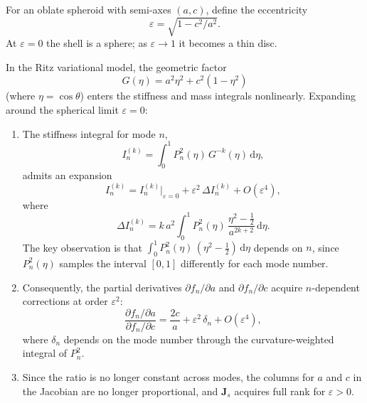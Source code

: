 For an oblate spheroid with semi-axes $(a,c)$, define the eccentricity
\begin{equation}\label{eq:eccentricity}
  \varepsilon = \sqrt{1 - c^2/a^2}.
\end{equation}
At $\varepsilon = 0$ the shell is a sphere; as $\varepsilon \to 1$ it becomes a
thin disc.

\begin{proposition}\label{prop:eccentricity}
In the Ritz variational model, the geometric factor
\begin{equation}\label{eq:Geta}
  G(\eta) = a^2 \eta^2 + c^2 (1 - \eta^2)
\end{equation}
(where $\eta = \cos\theta$) enters the stiffness and mass integrals
nonlinearly.  Expanding around the spherical limit $\varepsilon = 0$:
\begin{enumerate}
  \item The stiffness integral for mode $n$,
  \begin{equation}\label{eq:Ink}
    I_n^{(k)} = \int_0^1 P_n^2(\eta)\, G^{-k}(\eta)\,\mathrm{d}\eta,
  \end{equation}
  admits an expansion
  \begin{equation}\label{eq:Ink_expand}
    I_n^{(k)} = I_n^{(k)}\big|_{\varepsilon=0}
    + \varepsilon^2\,\Delta I_n^{(k)} + O(\varepsilon^4),
  \end{equation}
  where
  \begin{equation}\label{eq:Delta_Ink}
    \Delta I_n^{(k)}
    = k\,a^{2}\!\int_0^1 P_n^2(\eta)\,
      \frac{\eta^2 - \tfrac{1}{2}}{a^{2k+2}}\,\mathrm{d}\eta.
  \end{equation}
  The key observation is that
  $\int_0^1 P_n^2(\eta)\,(\eta^2 - \tfrac{1}{2})\,\mathrm{d}\eta$ depends on
  $n$, since $P_n^2(\eta)$ samples the interval $[0,1]$ differently for each
  mode number.

  \item Consequently, the partial derivatives $\partial f_n / \partial a$ and
  $\partial f_n / \partial c$ acquire $n$-dependent corrections at order
  $\varepsilon^2$:
  \begin{equation}\label{eq:ratio_corrected}
    \frac{\partial f_n / \partial a}
         {\partial f_n / \partial c}
    = \frac{2c}{a} + \varepsilon^2\,\delta_n + O(\varepsilon^4),
  \end{equation}
  where $\delta_n$ depends on the mode number through the curvature-weighted
  integral of $P_n^2$.

  \item Since the ratio is no longer constant across modes, the columns for $a$
  and $c$ in the Jacobian are no longer proportional, and
  $\mathbf{J}_s$ acquires full rank for $\varepsilon > 0$.
\end{enumerate}
\end{proposition}

